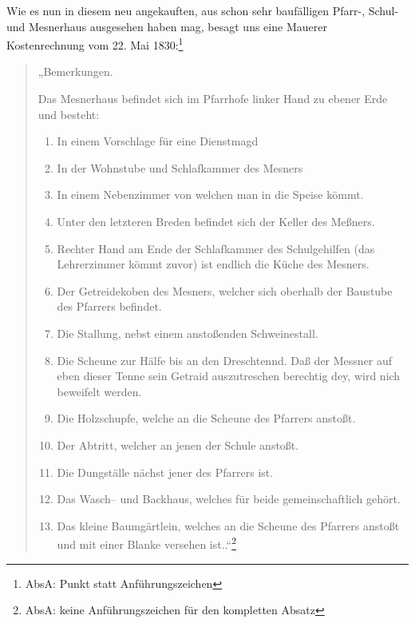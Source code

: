 \documentclass[12pt,a4paper]{book}
\begin{document}
Wie es nun in diesem neu angekauften, aus schon sehr baufälligen Pfarr-, Schul-
und Mesnerhaus ausgesehen haben mag, besagt uns eine Mauerer Kostenrechnung vom
22. Mai 1830:\footnote{AbsA: Punkt statt Anführungszeichen}

\begin{quote}

„Bemerkungen.

Das Mesnerhaus befindet sich im Pfarrhofe linker Hand zu ebener Erde und
besteht:

\begin{enumerate}
\item In einem Vorschlage für eine Dienstmagd

\item In der Wohnstube und Schlafkammer des Mesners

\item In einem Nebenzimmer von welchen man in die Speise kömmt.

\item Unter den letzteren Breden befindet sich der Keller des Meßners.

\item Rechter Hand am Ende der Schlafkammer des Schulgehilfen (das Lehrerzimmer
kömmt zuvor) ist endlich die Küche des Mesners.

\item Der Getreidekoben des Mesners, welcher sich oberhalb der Baustube des
Pfarrers befindet.

\item Die Stallung, nebst einem anstoßenden Schweinestall.

\item Die Scheune  zur Hälfe bis an den Dreschtennd. Daß der Messner auf eben
dieser Tenne sein Getraid auszutreschen berechtig dey, wird nich beweifelt
werden.

\item Die Holzschupfe, welche an die Scheune des Pfarrers anstoßt.

\item Der Abtritt, welcher an jenen der Schule anstoßt.

\item Die Dungställe nächst jener des Pfarrers ist.

\item Das Wasch– und Backhaus, welches für beide gemeinschaftlich gehört.

\item Das kleine Baumgärtlein, welches an die Scheune des Pfarrers anstoßt und
mit einer Blanke versehen ist..“\footnote{AbsA: keine Anführungszeichen für den
kompletten Absatz}
\end{enumerate}
\end{quote}
\end{document}
